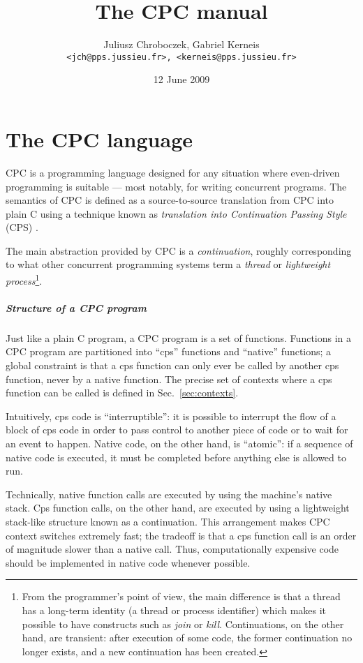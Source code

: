 \documentclass[a4paper]{report}
\title{The CPC manual}
\author{Juliusz Chroboczek, Gabriel Kerneis\\
{\tt <jch@pps.jussieu.fr>, <kerneis@pps.jussieu.fr>}}
\date{12 June 2009}
\begin{document}
\maketitle

\chapter{The CPC language} \label{chapter:language}

CPC is a programming language designed for any situation where
even-driven programming is suitable --- most notably, for writing
concurrent programs.  The semantics of CPC is defined as a
source-to-source translation from CPC into plain C using a
technique known as {\em translation into Continuation Passing Style\/}
(CPS) \cite{strachey:continuations, plotkin:call-by-lambda}.

The main abstraction provided by CPC is a {\em continuation}, roughly
corresponding to what other concurrent programming systems term a {\em
thread\/} or {\em lightweight process\/}\footnote{From the
programmer's point of view, the main difference is that a thread has
a long-term identity (a thread or process identifier) which makes it
possible to have constructs such as {\em join\/} or {\em kill}.
Continuations, on the other hand, are transient: after execution of
some code, the former continuation no longer exists, and a new
continuation has been created.}.

\paragraph{Structure of a CPC program}

Just like a plain C program, a CPC program is a set of functions.
Functions in a CPC program are partitioned into ``cps'' functions and
``native'' functions; a global constraint is that a cps function can
only ever be called by another cps function, never by a native
function.  The precise set of contexts where a cps function can be
called is defined in Sec.~\ref{sec:contexts}.

Intuitively, cps code is ``interruptible'': it is possible to
interrupt the flow of a block of cps code in order to pass control to
another piece of code or to wait for an event to happen.  Native code,
on the other hand, is ``atomic'': if a sequence of native code is
executed, it must be completed before anything else is allowed to run.

Technically, native function calls are executed by using the machine's
native stack.  Cps function calls, on the other hand, are executed by
using a lightweight stack-like structure known as a continuation.
This arrangement makes CPC context switches extremely fast; the
tradeoff is that a cps function call is an order of magnitude slower
than a native call.  Thus, computationally expensive code should be
implemented in native code whenever possible.
\end{document}
